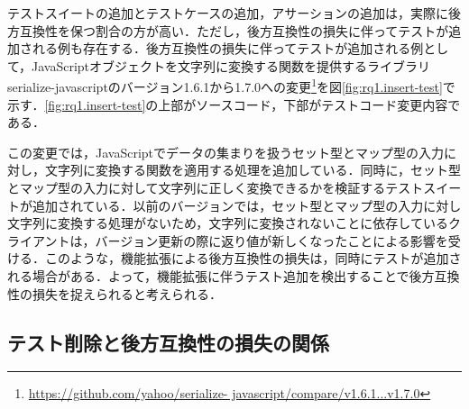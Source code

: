 \documentclass[11pt,dvipdfmx]{jreport}
\begin{document}
テストスイートの追加とテストケースの追加，アサーションの追加は，実際に後方互換性を保つ割合の方が高い．ただし，後方互換性の損失に伴ってテストが追加される例も存在する．後方互換性の損失に伴ってテストが追加される例として，JavaScriptオブジェクトを文字列に変換する関数を提供するライブラリserialize-javascriptのバージョン1.6.1から1.7.0への変更\footnote{\url{https://github.com/yahoo/serialize- javascript/compare/v1.6.1...v1.7.0}}を図\ref{fig:rq1.insert-test}で示す．\ref{fig:rq1.insert-test}の上部がソースコード，下部がテストコード変更内容である．

この変更では，JavaScriptでデータの集まりを扱うセット型とマップ型の入力に対し，文字列に変換する関数を適用する処理を追加している．同時に，セット型とマップ型の入力に対して文字列に正しく変換できるかを検証するテストスイートが追加されている．以前のバージョンでは，セット型とマップ型の入力に対し文字列に変換する処理がないため，文字列に変換されないことに依存しているクライアントは，バージョン更新の際に返り値が新しくなったことによる影響を受ける．このような，機能拡張による後方互換性の損失は，同時にテストが追加される場合がある．よって，機能拡張に伴うテスト追加を検出することで後方互換性の損失を捉えられると考えられる．

\subsection{テスト削除と後方互換性の損失の関係}
\end{document}
